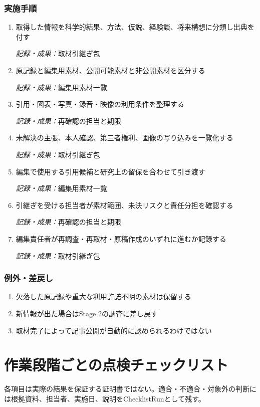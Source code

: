 \documentclass[a4paper,11pt]{article}
\begin{document}
\subsubsection*{実施手順}
\begin{enumerate}[leftmargin=2em,itemsep=0.65em]
\item 取得した情報を科学的結果、方法、仮説、経験談、将来構想に分類し出典を付す\par\noindent\textit{記録・成果：}取材引継ぎ包\nobreak\smallskip
\item 原記録と編集用素材、公開可能素材と非公開素材を区分する\par\noindent\textit{記録・成果：}編集用素材一覧\nobreak\smallskip
\item 引用・図表・写真・録音・映像の利用条件を整理する\par\noindent\textit{記録・成果：}再確認の担当と期限\nobreak\smallskip
\item 未解決の主張、本人確認、第三者権利、画像の写り込みを一覧化する\par\noindent\textit{記録・成果：}取材引継ぎ包\nobreak\smallskip
\item 編集で使用する引用候補と研究上の留保を合わせて引き渡す\par\noindent\textit{記録・成果：}編集用素材一覧\nobreak\smallskip
\item 引継ぎを受ける担当者が素材範囲、未決リスクと責任分担を確認する\par\noindent\textit{記録・成果：}再確認の担当と期限\nobreak\smallskip
\item 編集責任者が再調査・再取材・原稿作成のいずれに進むか記録する\par\noindent\textit{記録・成果：}取材引継ぎ包\nobreak\smallskip
\end{enumerate}
\subsubsection*{例外・差戻し}
\begin{enumerate}[leftmargin=2em,itemsep=0.35em]
\item 欠落した原記録や重大な利用許諾不明の素材は保留する
\item 新情報が出た場合はStage 2の調査に差し戻す
\item 取材完了によって記事公開が自動的に認められるわけではない
\end{enumerate}
\section{作業段階ごとの点検チェックリスト}
\par 各項目は実際の結果を保証する証明書ではない。適合・不適合・対象外の判断には根拠資料、担当者、実施日、説明をChecklistRunとして残す。\par\medskip
\end{document}
